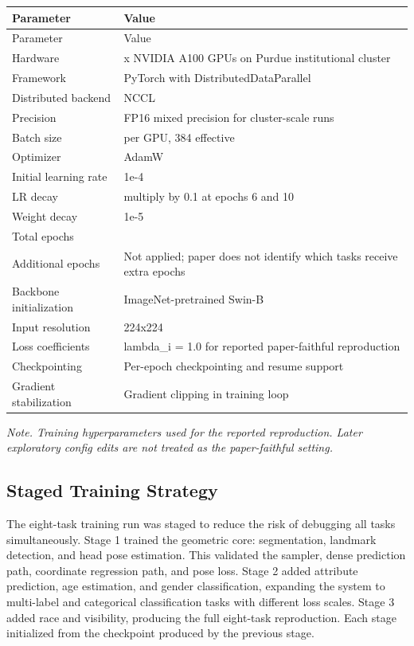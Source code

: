 \documentclass[11pt]{article}
\begin{document}
\begingroup
\scriptsize
\setlength{\tabcolsep}{3pt}
\begin{longtable}{@{}>{\RaggedRight\arraybackslash}p{}>{\RaggedRight\arraybackslash}p{}@{}}
\toprule
Parameter & Value \\
\midrule
\endfirsthead
\toprule
Parameter & Value \\
\midrule
\endhead
Hardware & 8 x NVIDIA A100 GPUs on Purdue institutional cluster \\
Framework & PyTorch with DistributedDataParallel \\
Distributed backend & NCCL \\
Precision & FP16 mixed precision for cluster-scale runs \\
Batch size & 48 per GPU, 384 effective \\
Optimizer & AdamW \\
Initial learning rate & 1e-4 \\
LR decay & multiply by 0.1 at epochs 6 and 10 \\
Weight decay & 1e-5 \\
Total epochs & 12 \\
Additional epochs & Not applied; paper does not identify which tasks receive extra epochs \\
Backbone initialization & ImageNet-pretrained Swin-B \\
Input resolution & 224x224 \\
Loss coefficients & lambda\_i = 1.0 for reported paper-faithful reproduction \\
Checkpointing & Per-epoch checkpointing and resume support \\
Gradient stabilization & Gradient clipping in training loop \\
\bottomrule
\end{longtable}
\endgroup


\emph{Note. Training hyperparameters used for the reported reproduction. Later exploratory config edits are not treated as the paper-faithful setting.}

\subsection{Staged Training Strategy}


The eight-task training run was staged to reduce the risk of debugging all tasks simultaneously. Stage 1 trained the geometric core: segmentation, landmark detection, and head pose estimation. This validated the sampler, dense prediction path, coordinate regression path, and pose loss. Stage 2 added attribute prediction, age estimation, and gender classification, expanding the system to multi-label and categorical classification tasks with different loss scales. Stage 3 added race and visibility, producing the full eight-task reproduction. Each stage initialized from the checkpoint produced by the previous stage.
\end{document}
